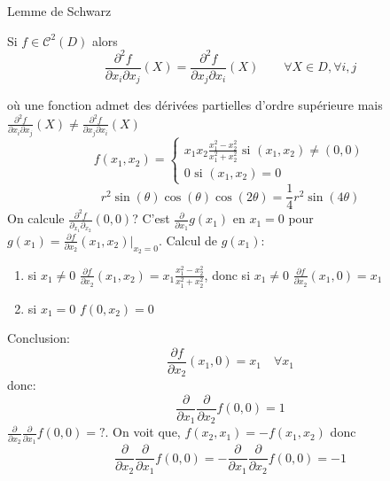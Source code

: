 \begin{theorem}\label{thm:lemme-de-schwarz}
    Lemme de Schwarz
    \par
    Si $f \in \mathcal{C}^2(D)$ alors 
    \[
        \displaystyle \frac{\partial^2 f}{\partial x_i\partial x_j}(X) = \frac{\partial^2 f}{\partial x_j\partial x_i}(X) \qquad \forall X \in D, \forall i, j
    \] 
\end{theorem}
\begin{eg} où une fonction admet des dérivées partielles d'ordre supérieure mais $\displaystyle \frac{\partial^2 f}{\partial x_i\partial x_j}(X) \neq  \frac{\partial^2 f}{\partial x_j\partial x_i}(X)$
   \[
   f(x_1, x_2) = \begin{cases}
       x_1x_2 \frac{x_1^2 - x_2^2}{x_1^2 + x_2^2} \text{ si } (x_1, x_2) \neq (0, 0)\\
       0 \text{ si } (x_1, x_2) = 0
   \end{cases}
   \]  
   \[
   r^2 \sin(\theta)\cos(\theta)\cos(2\theta) = \frac{1}{4}r^2\sin(4\theta)
   \] 
   On calcule $\displaystyle \frac{\partial^2f}{\partial_{x_1}\partial_{x_2}}(0, 0)$?
       C'est $\displaystyle \frac{\partial}{\partial x_1}g(x_1)$ en $x_1 = 0$ pour $\displaystyle g(x_1) = \frac{\partial f}{\partial x_2}(x_1, x_2)|_{x_2 = 0}$. Calcul de $g(x_1)$:
    \begin{enumerate}
        \item si $x_1 \neq 0$ $\frac{\partial f}{\partial x_2}(x_1, x_2) = x_1 \frac{x_1 ^ 2 - x_2^2}{x_1^2 + x_2^2}$, donc si $x_1 \neq 0$ $\frac{\partial f}{\partial x_2}(x_1, 0) = x_1$ 
        \item si $x_1 = 0$ $f(0, x_2) = 0$
    \end{enumerate}
    Conclusion:
    \[
    \frac{\partial f}{\partial x_2}(x_1, 0) = x_1 \quad \forall x_1
    \] 
    donc: 
    \[
    \frac{\partial}{\partial x_1}\frac{\partial}{\partial x_2}f(0, 0) = 1
    \] 
    $\displaystyle \frac{\partial}{\partial x_2}\frac{\partial}{\partial x_1}f(0, 0) = ?$. On voit que, $f(x_2, x_1) = -f(x_1, x_2)$ donc 
    \[
    \frac{\partial}{\partial x_2}\frac{\partial}{\partial x_1}f(0, 0) = - \frac{\partial}{\partial x_1}\frac{\partial}{\partial x_2}f(0, 0) = -1
    \] 
\end{eg}

